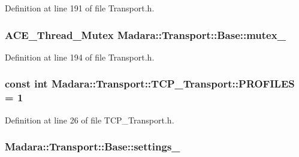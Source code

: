 Definition at line 191 of file Transport.h.

\hypertarget{classMadara_1_1Transport_1_1Base_a81479f3b01798d0836dc44629c904450}{
\subsubsection[{mutex\_\-}]{\setlength{\rightskip}{0pt plus 5cm}ACE\_\-Thread\_\-Mutex {\bf Madara::Transport::Base::mutex\_\-}}}
\label{dc/d97/classMadara_1_1Transport_1_1Base_a81479f3b01798d0836dc44629c904450}


Definition at line 194 of file Transport.h.

\hypertarget{classMadara_1_1Transport_1_1TCP__Transport_a927538615b34ce9fa62c571a83592974}{
\subsubsection[{PROFILES}]{\setlength{\rightskip}{0pt plus 5cm}const int {\bf Madara::Transport::TCP\_\-Transport::PROFILES} = 1}}
\label{d6/df1/classMadara_1_1Transport_1_1TCP__Transport_a927538615b34ce9fa62c571a83592974}


Definition at line 26 of file TCP\_\-Transport.h.

\hypertarget{classMadara_1_1Transport_1_1Base_adafa1a5641aaecae76d963748bddf8e2}{
\subsubsection[{settings\_\-}]{ {\bf Madara::Transport::Base::settings\_\-}}}
\label{dc/d97/classMadara_1_1Transport_1_1Base_adafa1a5641aaecae76d963748bddf8e2}


